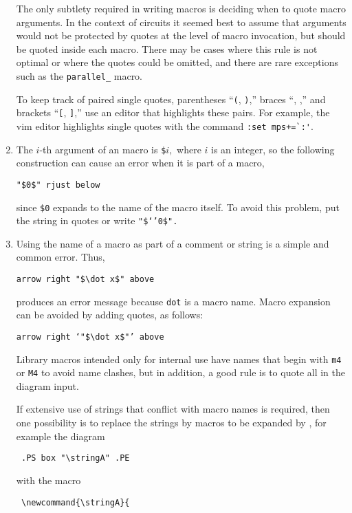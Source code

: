 \begin{enumerate}
  The only subtlety required in writing
  \Mfour macros is deciding when to quote macro arguments.  In the context
  of circuits it seemed best to assume that arguments would not
  be protected by quotes at the level of macro invocation, but should
  be quoted inside each macro.  There may be cases where this rule is
  not optimal or where the quotes could be omitted, and there are
  rare exceptions such as the {\tt parallel\_} macro.

  To keep track of paired single quotes, parentheses ``{\tt (}, {\tt)},''
  braces ``\lbr, \rbr,'' and brackets ``{\tt [}, {\tt ]},'' use an editor
  that highlights these pairs.  For example, the vim editor highlights
  single quotes with the command \verb|:set mps+=`:'|.

\item 
{}
The $i$-th argument of an \Mfour macro is {\tt \$}$i,$ where $i$ is
an integer, so the following construction can cause an error when it
is part of a macro,

{\tt "\$0\$" rjust below}

\noindent since {\tt \$0} expands to the name of the macro itself.
To avoid this problem, put the string in quotes or write
 {\tt "\$`'0\$".}

\item 
{}
 Using the name of a macro as part of a comment or string is a
 simple and common error. Thus,

{\tt arrow right \verb|"$\dot x$"| above}

\noindent produces an error message because {\tt dot} is a macro
name.   Macro expansion can be avoided by adding quotes, as follows:

{\tt arrow right `\verb|"$\dot x$"|'\ above}

Library macros intended only for internal use have names that begin
with {\tt m4} or {\tt M4} to avoid name clashes, but in addition,
a good rule is to quote all \latex in the diagram input.

If extensive use of strings
that conflict with macro names is required, then one possibility is
to replace the strings by macros to be expanded by \latex, for example
the diagram

{\tt
.PS\hfill\break
   \hspace*{\parindent} box \verb|"\stringA"|\hfill\break
.PE
}

\noindent with the \latex macro

{\tt
  \verb|\newcommand{\stringA}{|%

}
\end{enumerate}
